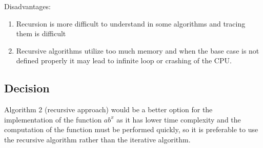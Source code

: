 \documentclass[12pt, a4paper]{article}
\begin{document}
Disadvantages:
\begin{enumerate}
    \item {Recursion is more difficult to understand in some algorithms and tracing them is difficult}
    \item {Recursive algorithms utilize too much memory and when the base case is not defined properly it may lead to infinite loop or crashing of the CPU.}
    
\end{enumerate}

\subsection*{Decision}
Algorithm 2 (recursive approach) would be a better option for the implementation of the function $ab^x$ as it has lower time complexity and the computation of the function must be performed quickly, so it is preferable to use the recursive algorithm rather than the iterative algorithm.
\end{document}
